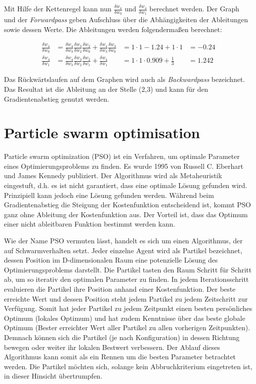 Mit Hilfe der Kettenregel kann nun $\frac{\delta w_4}{\delta w_0}$ und $\frac{\delta w_4}{\delta w_1}$ berechnet werden. Der Graph und der \textit{Forwardpass} geben Aufschluss über die Abhängigkeiten der Ableitungen sowie dessen Werte.
Die Ableitungen werden folgendermaßen berechnet:

\begin{subequations}
\begin{align*}
\frac{\delta w_4}{\delta w_0} & = \frac{\delta w_4}{\delta w_3} \frac{\delta w_3}{\delta w_2}\frac{\delta w_2}{\delta w_0} + \frac{\delta w_4}{\delta w_3} \frac{\delta w_3}{\delta w_0 } &= 1 \cdot 1 -1.24 + 1 \cdot 1 &= -0.24 \\
\frac{\delta w_4}{\delta w_1} & = \frac{\delta w_4}{\delta w_3} \frac{\delta w_3}{\delta w_2} \frac{\delta w_2}{\delta w_1} + \frac{\delta w_4}{\delta w_1} &= 1 \cdot 1 \cdot 0.909 + \frac{1}{3} & = 1.242
\end{align*}
\end{subequations}

Das Rückwärtslaufen auf dem Graphen wird auch als \textit{Backwardpass} bezeichnet.
Das Resultat ist die Ableitung an der Stelle (2,3) und kann für den Gradientenabstieg genutzt werden.


\section{Particle swarm optimisation}\label{sec:PSO}

Particle swarm optimization (PSO) ist ein Verfahren, um optimale Parameter eines Optimierungsproblems zu finden. Es wurde 1995 von Russell C. Eberhart und James Kennedy publiziert. Der Algorithmus wird als Metaheuristik eingestuft, d.h. es ist nicht garantiert, dass eine optimale Lösung gefunden wird.
Prinzipiell kann jedoch eine Lösung gefunden werden. Während beim Gradientenabstieg die Steigung der Kostenfunktion entscheidend ist, kommt PSO ganz ohne Ableitung der Kostenfunktion aus. Der Vorteil ist, dass das Optimum einer nicht ableitbaren Funktion bestimmt werden kann.

Wie der Name PSO vermuten lässt, handelt es sich um einen Algorithmus, der auf Schwarmverhalten setzt. Jeder einzelne Agent wird als Partikel bezeichnet, dessen Position im D-dimensionalen Raum eine potenzielle Lösung des Optimierungsproblems darstellt.
Die Partikel tasten den Raum Schritt für Schritt ab, um so iterativ den optimalen Parameter zu finden.
In jedem Iterationsschritt evaluieren die Partikel ihre Position anhand einer Kostenfunktion.
Der beste erreichte Wert und dessen Position steht jedem Partikel zu jedem Zeitschritt zur Verfügung.
Somit hat jeder Partikel zu jedem Zeitpunkt einen besten persönliches Optimum (lokales Optimum) und hat zudem Kenntnisse über das beste globale Optimum (Bester erreichter Wert aller Partikel zu allen vorherigen Zeitpunkten). Demnach können sich die Partikel (je nach Konfiguration) in dessen Richtung bewegen oder weiter ihr lokalen Bestwert verbessern. Der Ablauf dieses Algorithmus kann somit als ein Rennen um die besten Parameter betrachtet werden. Die Partikel möchten sich, solange kein Abbruchkriterium eingetreten ist, in dieser Hinsicht übertrumpfen.



